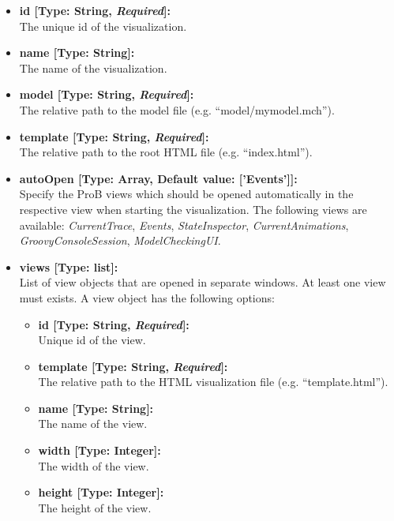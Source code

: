 \begin{itemize}
	\item[] \textbf{id [Type: String, \textit{Required}]:}\\The unique id of the visualization.
	\item[] \textbf{name [Type: String]:}\\The name of the visualization.
	\item[] \textbf{model [Type: String, \textit{Required}]:}\\The relative path to the model file (e.g. ``model/mymodel.mch'').
	\item[] \textbf{template [Type: String, \textit{Required}]:}\\The relative path to the root HTML file (e.g. ``index.html'').
	\item[] \textbf{autoOpen [Type: Array, Default value: ['Events']]:}\\Specify the ProB views which should be opened automatically in the respective view when starting the visualization. 
The following views are available: \textit{CurrentTrace}, \textit{Events}, \textit{StateInspector}, \textit{CurrentAnimations}, \textit{GroovyConsoleSession}, \textit{ModelCheckingUI}.
	\item[] \textbf{views [Type: list]:}\\ List of view objects that are opened in separate windows.
	At least one view must exists.
	A view object has the following options:
	\begin{itemize}
		\item[] \textbf{id [Type: String, \textit{Required}]:}\\ Unique id of the view.
		\item[] \textbf{template [Type: String, \textit{Required}]:}\\ The relative path to the HTML visualization file (e.g. ``template.html'').
		\item[] \textbf{name [Type: String]:}\\ The name of the view.
		\item[] \textbf{width [Type: Integer]:}\\ The width of the view.
		\item[] \textbf{height [Type: Integer]:}\\ The height of the view.
	\end{itemize}
\end{itemize}

